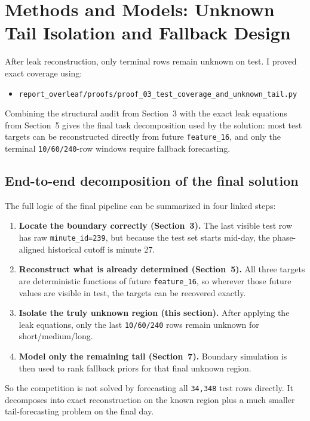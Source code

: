 \section{Methods and Models: Unknown Tail Isolation and Fallback Design}

After leak reconstruction, only terminal rows remain unknown on test. I proved exact coverage using:
\begin{itemize}[leftmargin=1.5em]
  \item \texttt{report\_overleaf/proofs/proof\_03\_test\_coverage\_and\_unknown\_tail.py}
\end{itemize}
Combining the structural audit from Section~3 with the exact leak equations from Section~5 gives the final task decomposition used by the solution: most test targets can be reconstructed directly from future \texttt{feature\_16}, and only the terminal \texttt{10/60/240}-row windows require fallback forecasting.

\subsection{End-to-end decomposition of the final solution}
The full logic of the final pipeline can be summarized in four linked steps:
\begin{enumerate}[leftmargin=1.5em]
  \item \textbf{Locate the boundary correctly (Section~3).} The last visible test row has raw \texttt{minute\_id=239}, but because the test set starts mid-day, the phase-aligned historical cutoff is minute 27.
  \item \textbf{Reconstruct what is already determined (Section~5).} All three targets are deterministic functions of future \texttt{feature\_16}, so wherever those future values are visible in test, the targets can be recovered exactly.
  \item \textbf{Isolate the truly unknown region (this section).} After applying the leak equations, only the last \texttt{10/60/240} rows remain unknown for short/medium/long.
  \item \textbf{Model only the remaining tail (Section~7).} Boundary simulation is then used to rank fallback priors for that final unknown region.
\end{enumerate}
So the competition is not solved by forecasting all \texttt{34{,}348} test rows directly. It decomposes into exact reconstruction on the known region plus a much smaller tail-forecasting problem on the final day.

